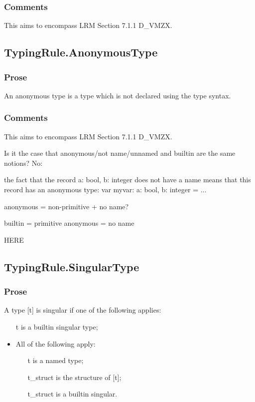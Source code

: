 \documentclass{book}
\begin{document}
    \subsubsection{Comments}
    This aims to encompass LRM Section 7.1.1 D\_VMZX.

\subsection{TypingRule.AnonymousType}

    \subsubsection{Prose} 
    An anonymous type is a type which is not declared using the type syntax. 

    \subsubsection{Comments}
    This aims to encompass LRM Section 7.1.1 D\_VMZX.

    Is it the case that anonymous/not name/unnamed and builtin are the same notions?
    No:

    the fact that the record {a: bool, b: integer} does not have a name means that this record has an anonymous type:
    var myvar: {a: bool, b: integer} = ...

    anonymous = non-primitive + no name?

    builtin = primitive
    anonymous = no name

    HERE

\subsection{TypingRule.SingularType}

    \subsubsection{Prose}
    A type [t] is singular if one of the following applies:
    \begin{itemize}
    \item  [t] is a builtin singular type;
    \item  All of the following apply:
      \begin{itemize}
      \item  [t] is a named type;
      \item  [t\_struct] is the structure of [t];
      \item  [t\_struct] is a builtin singular.
      \end{itemize} 
    \end{itemize}
\end{document}
